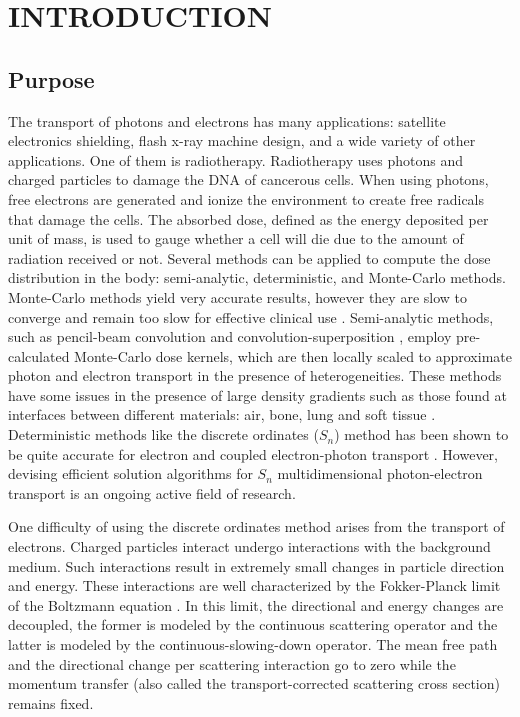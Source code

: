 \pagestyle{plain}
\setcounter{page}{1}
\chapter{\uppercase{Introduction}}
\section{Purpose}
The transport of photons and electrons has many applications: satellite
electronics shielding, flash x-ray machine design, and a wide variety of other
applications. One of them is 
radiotherapy. Radiotherapy uses photons and charged particles to 
damage the DNA of cancerous cells. When using photons, free electrons are 
generated and ionize the environment to create free radicals that damage the cells. 
The absorbed dose, defined as the energy deposited per unit of mass, is used to 
gauge whether a cell will die due to the amount of radiation received or not. 
Several methods can be
applied to compute the dose distribution in the body: semi-analytic,
deterministic, and Monte-Carlo methods. Monte-Carlo methods yield very
accurate results, however they are slow to converge and remain too slow for
effective clinical use \cite{acuros,comet}. Semi-analytic methods, such as
pencil-beam convolution \cite{pencil_beam_2,pencil_beam_1} and 
convolution-superposition \cite{superposition}, employ pre-calculated
Monte-Carlo dose kernels, which are then locally scaled to approximate photon
and electron transport in the presence of heterogeneities. These methods
have some issues in the presence of large density gradients such as those
found at interfaces between different materials: air, bone, lung and soft
tissue \cite{krieger,seco,acuros}. Deterministic methods like the discrete 
ordinates ($S_n$) method has been shown to be quite accurate for electron and 
coupled electron-photon transport \cite{accuracy_2,morel_81,accuracy_1}.
However, devising efficient solution algorithms for $S_n$ multidimensional
photon-electron transport is an ongoing active field of research.

One difficulty of using the discrete ordinates method arises from the transport 
of electrons. Charged particles interact undergo interactions with the 
background medium. Such interactions result in extremely small changes in particle 
direction and energy. These interactions are well characterized by the 
Fokker-Planck limit of the Boltzmann equation \cite{fp_limit,morel_96}. In this 
limit, the directional and energy changes are decoupled, the former is modeled 
by the continuous scattering operator and the latter is modeled by the 
continuous-slowing-down operator. The mean free path and the directional 
change per scattering interaction go to zero while the momentum transfer (also 
called the transport-corrected scattering cross section) remains fixed.


